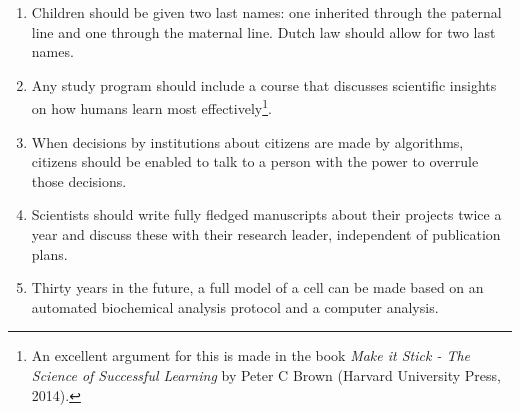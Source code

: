 \begin{enumerate}[nosep]
    \item
    Children should be given two last names: 
    one inherited through the paternal line and 
    one through the maternal line.
    Dutch law should allow for two last names.  
    \item Any study program should include a course that discusses scientific insights on how humans learn most effectively\footnote{An excellent argument for this is made in the book \textit{Make it Stick - The Science of Successful Learning} by Peter C Brown (Harvard University Press, 2014).}.
    \item When decisions by 
    institutions about citizens are made by algorithms,
    citizens should be enabled to talk to a person with the power to overrule those decisions.
    \item 
    Scientists
    should write fully fledged manuscripts
    about their projects twice a year %
    and discuss these with their research leader,  
    independent of publication plans.   
    \item Thirty years in the future, a full model of a cell can be made based on an automated biochemical analysis protocol and a computer analysis.

\end{enumerate}

